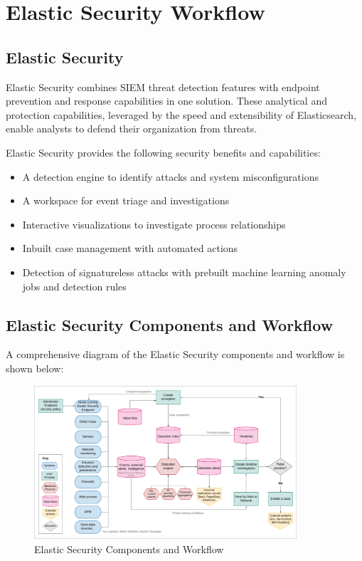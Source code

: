 \documentclass{report}
\begin{document}
\chapter{Elastic Security Workflow}

\section{Elastic Security}
Elastic Security combines SIEM threat detection features with endpoint prevention and response capabilities in one solution. 
These analytical and protection capabilities, leveraged by the speed and extensibility of Elasticsearch, 
enable analysts to defend their organization from threats.

Elastic Security provides the following security benefits and capabilities:
\begin{itemize}
	\item A detection engine to identify attacks and system misconfigurations
	\item A workspace for event triage and investigations
	\item Interactive visualizations to investigate process relationships
	\item Inbuilt case management with automated actions
	\item Detection of signatureless attacks with prebuilt machine learning anomaly jobs and detection rules
\end{itemize}

\section{Elastic Security Components and Workflow}
A comprehensive diagram of the Elastic Security components and workflow is shown below:
\begin{figure}[ht]
	\centering
	\includegraphics[width=0.87\textwidth]{Images/Security_Workflow.png}
	\caption{Elastic Security Components and Workflow}
	\label{fig:Elastic Security Components and Workflow}
\end{figure}
\end{document}
